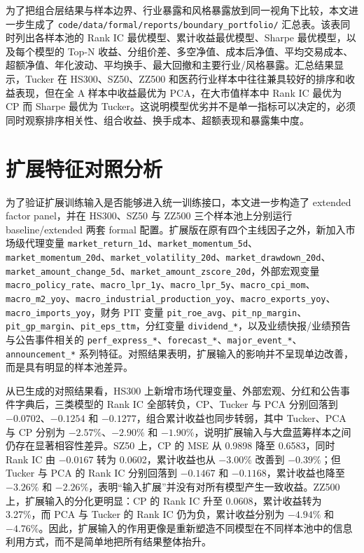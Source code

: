 为了把组合层结果与样本边界、行业暴露和风格暴露放到同一视角下比较，本文进一步生成了 \texttt{code/data/formal/reports/boundary\_portfolio/} 汇总表。该表同时列出各样本池的 Rank IC 最优模型、累计收益最优模型、Sharpe 最优模型，以及每个模型的 Top-N 收益、分组价差、多空净值、成本后净值、平均交易成本、超额净值、年化波动、平均换手、最大回撤和主要行业/风格暴露。汇总结果显示，Tucker 在 HS300、SZ50、ZZ500 和医药行业样本中往往兼具较好的排序和收益表现，但在全 A 样本中收益最优为 PCA，在大市值样本中 Rank IC 最优为 CP 而 Sharpe 最优为 Tucker。这说明模型优劣并不是单一指标可以决定的，必须同时观察排序相关性、组合收益、换手成本、超额表现和暴露集中度。

\section{扩展特征对照分析}

为了验证扩展训练输入是否能够进入统一训练接口，本文进一步构造了 extended factor panel，并在 HS300、SZ50 与 ZZ500 三个样本池上分别运行 baseline/extended 两套 formal 配置。扩展版在原有四个主线因子之外，新加入市场级代理变量 \texttt{market\_return\_1d}、\texttt{market\_momentum\_5d}、\texttt{market\_momentum\_20d}、\texttt{market\_volatility\_20d}、\texttt{market\_drawdown\_20d}、\texttt{market\_amount\_change\_5d}、\texttt{market\_amount\_zscore\_20d}，外部宏观变量 \texttt{macro\_policy\_rate}、\texttt{macro\_lpr\_1y}、\texttt{macro\_lpr\_5y}、\texttt{macro\_cpi\_mom}、\texttt{macro\_m2\_yoy}、\texttt{macro\_industrial\_production\_yoy}、\texttt{macro\_exports\_yoy}、\texttt{macro\_imports\_yoy}，财务 PIT 变量 \texttt{pit\_roe\_avg}、\texttt{pit\_np\_margin}、\texttt{pit\_gp\_margin}、\texttt{pit\_eps\_ttm}，分红变量 \texttt{dividend\_*}，以及业绩快报/业绩预告与公告事件相关的 \texttt{perf\_express\_*}、\texttt{forecast\_*}、\texttt{major\_event\_*}、\texttt{announcement\_*} 系列特征。对照结果表明，扩展输入的影响并不呈现单边改善，而是具有明显的样本池差异。

从已生成的对照结果看，HS300 上新增市场代理变量、外部宏观、分红和公告事件字典后，三类模型的 Rank IC 全部转负，CP、Tucker 与 PCA 分别回落到 $-0.0702$、$-0.1254$ 和 $-0.1277$，组合累计收益也同步转弱，其中 Tucker、PCA 与 CP 分别为 $-2.57\%$、$-2.90\%$ 和 $-1.90\%$，说明扩展输入与大盘蓝筹样本之间仍存在显著相容性差异。SZ50 上，CP 的 MSE 从 0.9898 降至 0.6583，同时 Rank IC 由 $-0.0167$ 转为 0.0602，累计收益也从 $-3.00\%$ 改善到 $-0.39\%$；但 Tucker 与 PCA 的 Rank IC 分别回落到 $-0.1467$ 和 $-0.1168$，累计收益也降至 $-3.26\%$ 和 $-2.26\%$，表明“输入扩展”并没有对所有模型产生一致收益。ZZ500 上，扩展输入的分化更明显：CP 的 Rank IC 升至 0.0608，累计收益转为 3.27\%，而 PCA 与 Tucker 的 Rank IC 仍为负，累计收益分别为 $-4.94\%$ 和 $-4.76\%$。因此，扩展输入的作用更像是重新塑造不同模型在不同样本池中的信息利用方式，而不是简单地把所有结果整体抬升。

